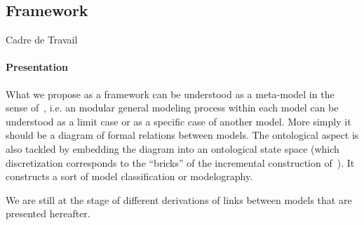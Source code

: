 \subsection{Framework}{Cadre de Travail}


\paragraph{Presentation}
What we propose as a framework can be understood as a meta-model in the sense of~\cite{cottineau2015incremental}, i.e. an modular general modeling process within each model can be understood as a limit case or as a specific case of another model. More simply it should be a diagram of formal relations between models.
 The ontological aspect is also tackled by embedding the diagram into an ontological state space (which discretization corresponds to the ``bricks'' of the incremental construction of~\cite{cottineau2015incremental}). It constructs a sort of model classification or modelography. 

We are still at the stage of different derivations of links between models that are presented hereafter.









